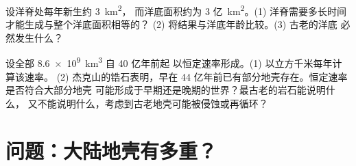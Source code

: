 \begin{exercise}[$\star\star\star$]\label{exo:g12:continental-crust:14}
设洋脊处每年新生约 \qty{3}{km^2}，
而洋底面积约为 3 亿~\unit{km^2}。(1)
洋脊需要多长时间才能生成与整个洋底面积相等的？
(2) 将结果与洋底年龄比较。(3) 古老的洋底
必然发生什么？
\end{exercise}

\begin{exercise}[$\star\star\star$]\label{exo:g12:continental-crust:15}
设全部 \qty{8.6e9}{km^3} 自 40 亿年前起
以恒定速率形成。(1) 以立方千米每年计算该速率。
(2) 杰克山的锆石表明，早在
44 亿年前已有部分地壳存在。恒定速率是否符合大部分地壳
可能形成于早期还是晚期的世界？最古老的岩石能说明什么，
又不能说明什么，考虑到古老地壳可能被侵蚀或再循环？
\end{exercise}

\section{问题：大陆地壳有多重？}

